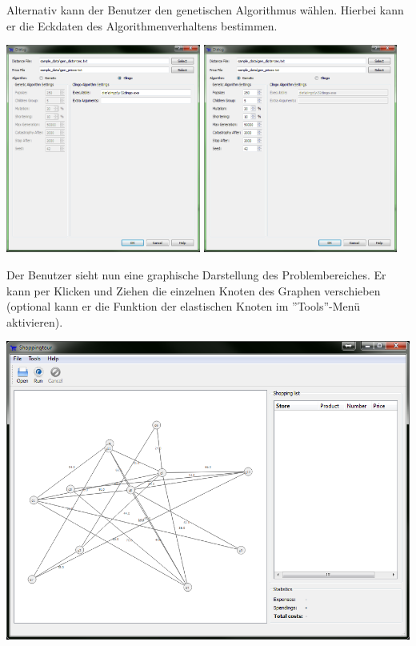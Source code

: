 Alternativ kann der Benutzer den genetischen Algorithmus wählen. Hierbei kann er die Eckdaten des Algorithmenverhaltens bestimmen.

\includegraphics[width=0.48\textwidth]{resourcen/walkthrough/1a-open-clingo.png} \includegraphics[width=0.48\textwidth]{resourcen/walkthrough/1b-open-genetic.png}

\newpage

Der Benutzer sieht nun eine graphische Darstellung des Problembereiches. Er kann per Klicken und Ziehen die einzelnen Knoten des Graphen verschieben (optional kann er die Funktion der elastischen Knoten im ''Tools''-Menü aktivieren).

\includegraphics[width=1\textwidth]{resourcen/walkthrough/2-opened-clingo.png}

